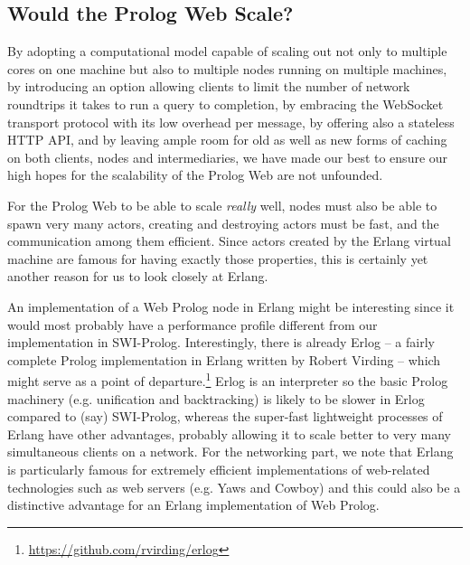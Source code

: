\documentclass{tlp}
\begin{document}


\subsection{Would the Prolog Web Scale?}

\noindent By adopting a computational model capable of scaling out not only to multiple cores on one machine but also to multiple nodes running on multiple machines, by introducing an option allowing clients to limit the number of network roundtrips it takes to run a query to completion, by embracing the WebSocket transport protocol with its low overhead per message, by offering also a stateless HTTP API, and by leaving ample room for old as well as new forms of caching on both clients, nodes and intermediaries, we have made our best to ensure our high hopes for the scalability of the Prolog Web are not unfounded.

For the Prolog Web to be able to scale \textit{really} well, nodes must also be able to spawn very many actors, creating and destroying actors must be fast, and the communication among them efficient. Since actors created by the Erlang virtual machine are famous for having exactly those properties, this is certainly yet another reason for us to look closely at Erlang.

An implementation of a Web Prolog node in Erlang might be interesting since it would most probably have a performance profile different from our implementation in SWI-Prolog. Interestingly, there is already Erlog -- a fairly complete Prolog implementation in Erlang written by Robert Virding -- which might serve as a point of departure.\footnote{\url{https://github.com/rvirding/erlog}} Erlog is an interpreter so the basic Prolog machinery (e.g. unification and backtracking) is likely to be slower in Erlog compared to (say) SWI-Prolog, whereas the super-fast lightweight processes of Erlang have other advantages, probably allowing it to scale better to very many simultaneous clients on a network. For the networking part, we note that Erlang is particularly famous for extremely efficient implementations of web-related technologies such as web servers (e.g. Yaws and Cowboy) and this could also be a distinctive advantage for an Erlang implementation of Web Prolog. 
\end{document}
